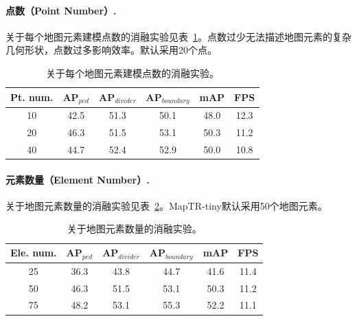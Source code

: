 \documentclass{article} %
\begin{document}
\paragraph{点数（Point Number）.}
关于每个地图元素建模点数的消融实验见表~\ref{tab:point-number}。点数过少无法描述地图元素的复杂几何形状，点数过多影响效率。默认采用20个点。

\begin{table}[ht]
\begin{center}
\begin{tabular}{c|ccc|cc}
\hline
\rowcolor{Gray}
Pt. num. & AP$_{\textit{ped}}$ & AP$_{\textit{divider}}$ & AP$_{\textit{boundary}}$ &mAP & FPS  \\
\toprule
10        &42.5&51.3&50.1& 48.0  & 12.3 \\
20  &\cellcolor{blue!10}46.3&\cellcolor{blue!10}51.5&\cellcolor{blue!10}53.1&\cellcolor{blue!10}50.3&\cellcolor{blue!10}11.2\\
40 &44.7&52.4&52.9  &50.0 & 10.8\\
\bottomrule
\end{tabular}
\end{center}
\vspace*{-0.45cm}
\caption{关于每个地图元素建模点数的消融实验。}
\label{tab:point-number}
\vspace*{-0.35cm}
\end{table}


\paragraph{元素数量（Element Number）.}
关于地图元素数量的消融实验见表~\ref{tab:element-number}。MapTR-tiny默认采用50个地图元素。

\begin{table}[ht]
\begin{center}
\begin{tabular}{c|ccc|cc}
\hline
\rowcolor{Gray}
Ele. num. & AP$_{\textit{ped}}$ & AP$_{\textit{divider}}$ & AP$_{\textit{boundary}}$ &mAP & FPS  \\
\toprule
25        &36.3&43.8&44.7& 41.6  & 11.4 \\
50  &\cellcolor{blue!10}46.3&\cellcolor{blue!10}51.5&\cellcolor{blue!10}53.1&\cellcolor{blue!10}50.3&\cellcolor{blue!10}11.2\\
75 &48.2&53.1&55.3  &52.2 & 11.1\\
\bottomrule
\end{tabular}
\end{center}
\vspace*{-0.45cm}
\caption{关于地图元素数量的消融实验。}
\label{tab:element-number}
\vspace*{-0.35cm}
\end{table}
\end{document}
